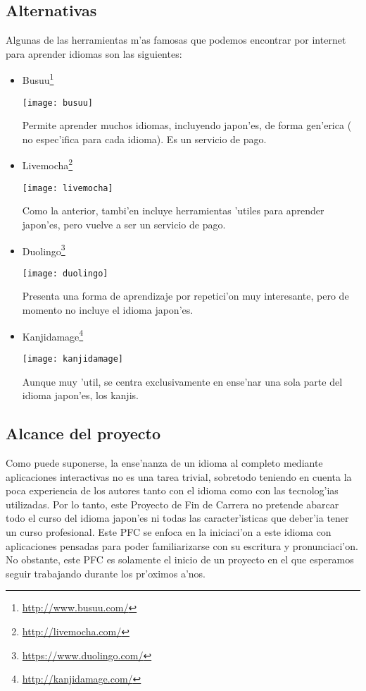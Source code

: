 \subsection{Alternativas}
\label{sub:alternativas}
Algunas de las herramientas m'as famosas que podemos encontrar por internet para aprender idiomas son las siguientes:
\begin{itemize}
 \item Busuu\footnote{\url{http://www.busuu.com/}}

 \begin{center}
 \texttt{[image: busuu]}
 \end{center}

 Permite aprender muchos idiomas, incluyendo japon'es, de forma gen'erica ( no espec'ifica para cada idioma). Es un servicio de pago.
 \item Livemocha\footnote{\url{http://livemocha.com/}}

 \begin{center}
 \texttt{[image: livemocha]}
 \end{center}

 Como la anterior, tambi'en incluye herramientas 'utiles para aprender japon'es, pero vuelve a ser un servicio de pago.
 \item Duolingo\footnote{\url{https://www.duolingo.com/}}
 
 \begin{center}
 \texttt{[image: duolingo]}
 \end{center}
 
 Presenta una forma de aprendizaje por repetici'on muy interesante, pero de momento no incluye el idioma japon'es.
 \item Kanjidamage\footnote{\url{http://kanjidamage.com/}}
 
 \begin{center}
 \texttt{[image: kanjidamage]}
 \end{center}
 
 Aunque muy 'util, se centra exclusivamente en ense'nar una sola parte del idioma japon'es, los kanjis.
\end{itemize}


\subsection{Alcance del proyecto}
\label{sub:alcance_del_proyecto}
Como puede suponerse, la ense'nanza de un idioma al completo mediante aplicaciones interactivas no es
una tarea trivial, sobretodo teniendo en cuenta la poca experiencia de los autores tanto con el idioma
como con las tecnolog'ias utilizadas. Por lo tanto, este Proyecto de Fin de Carrera no pretende abarcar todo el
curso del idioma japon'es ni todas las caracter'isticas que deber'ia tener un curso profesional.
Este PFC se enfoca en la iniciaci'on a este idioma con aplicaciones pensadas para poder familiarizarse
con su escritura y pronunciaci'on. No obstante, este PFC es solamente el inicio de un proyecto en el que
esperamos seguir trabajando durante los pr'oximos a'nos.

